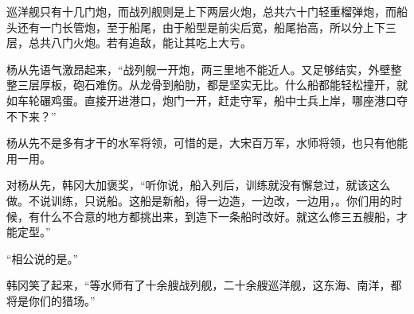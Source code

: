 巡洋舰只有十几门炮，而战列舰则是上下两层火炮，总共六十门轻重榴弹炮，而船头还有一门长管炮，至于船尾，由于船型是前尖后宽，船尾抬高，所以分上下三层，总共八门火炮。若有追敌，能让其吃上大亏。

杨从先语气激昂起来，“战列舰一开炮，两三里地不能近人。又足够结实，外壁整整三层厚板，砲石难伤。从龙骨到船肋，都是坚实无比。什么船都能轻松撞开，就如车轮碾鸡蛋。直接开进港口，炮门一开，赶走守军，船中士兵上岸，哪座港口夺不下来？”

杨从先不是多有才干的水军将领，可惜的是，大宋百万军，水师将领，也只有他能用一用。

对杨从先，韩冈大加褒奖，“听你说，船入列后，训练就没有懈怠过，就该这么做。不说训练，只说船。这船是新船，得一边造，一边改，一边用，。你们用的时候，有什么不合意的地方都挑出来，到造下一条船时改好。就这么修三五艘船，才能定型。”

“相公说的是。”

韩冈笑了起来，“等水师有了十余艘战列舰，二十余艘巡洋舰，这东海、南洋，都将是你们的猎场。”

